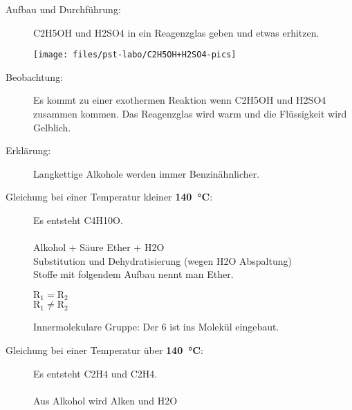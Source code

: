 \begin{description}
	\item[Aufbau und Durchführung:] \ac{C2H5OH} und \ac{H2SO4} in ein Reagenzglas geben
		und etwas erhitzen. \\
		\begin{figurewrapper}\vspace{-1em}
			\texttt{[image: files/pst-labo/C2H5OH+H2SO4-pics]}
		\end{figurewrapper}\vspace{-1em}
	\item[Beobachtung:] Es kommt zu einer exothermen Reaktion wenn \ac{C2H5OH} und \ac{H2SO4}
		zusammen kommen. Das Reagenzglas wird warm und die Flüssigkeit wird Gelblich.
	\item[Erklärung:] Langkettige Alkohole werden immer Benzinähnlicher.
	\item[Gleichung bei einer Temperatur kleiner \textbf{\SI[detect-weight]{140}{\degreeCelsius}}:]
		Es entsteht \ac{C4H10O}. \\[0.5em]
		 \\
		Alkohol + Säure \ce{->} Ether + \ac{H2O} \\
		Substitution und Dehydratisierung (wegen \ac{H2O} Abspaltung) \\
		Stoffe mit folgendem Aufbau nennt man Ether. \\[0.3em]
		\begin{minipage}{7em}
		\end{minipage}
		\begin{minipage}{5em}
			$\mathrm{R_1 = R_2}$ \\
			$\mathrm{R_1 \neq R_2}$
		\end{minipage}\hfill
		\begin{minipage}{25em}
			Innermolekulare Gruppe: Der \ac{6} ist ins Molekül eingebaut.
		\end{minipage}
	\item[Gleichung bei einer Temperatur über \textbf{\SI[detect-weight]{140}{\degreeCelsius}}:]
		Es entsteht \ac{C2H4} und \ac{C2H4}. \\[0.5em]
		 \textcolor{red}{} \chemsign{+}
		 \\[0.5em]
		Aus Alkohol wird Alken und \ac{H2O}
\end{description}

